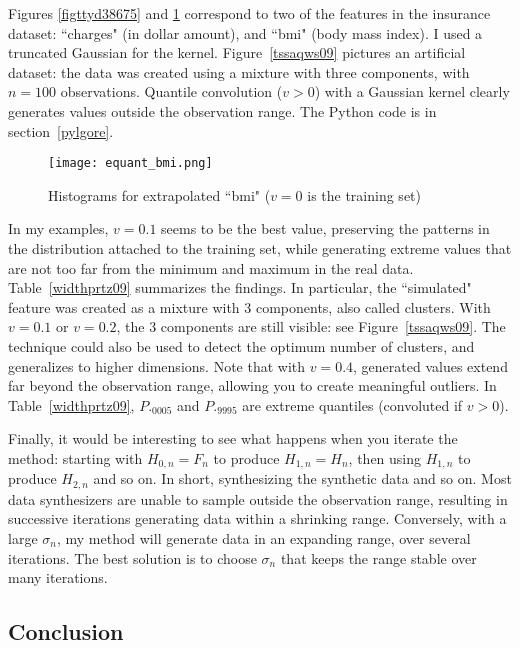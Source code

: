 \documentclass[oneside,10pt]{book}
\begin{document}
Figures \ref{figttyd38675} and  \ref{fig:pif65lkh} correspond to two of the features in the insurance dataset: ``charges" (in dollar amount), and ``bmi" (body mass index). I used a truncated Gaussian for the kernel.
Figure~\ref{tssaqws09} pictures an artificial dataset: the data was created using a mixture with three components, with $n=100$ observations. Quantile convolution ($v>0$) with a Gaussian kernel clearly generates values  outside the observation range. The Python code is in section~\ref{pylgore}.




\begin{figure}[H]
\centering
\texttt{[image: equant\_bmi.png]}
\caption{Histograms for extrapolated ``bmi" ($v=0$ is the training set)}
\label{fig:pif65lkh}
\end{figure}

In my examples, $v=0.1$ seems to be the best value, preserving the patterns in the distribution attached to the training set, while generating extreme values that are not too far from the minimum and maximum in
 the real data. Table~\ref{widthprtz09} summarizes the findings. In particular, the ``simulated" feature
 was created as a mixture with 3 components, also called clusters. With $v=0.1$ or $v=0.2$, the 3 components are still visible: see Figure~\ref{tssaqws09}.
The technique could also be used to detect the optimum number of clusters, and generalizes to higher dimensions. Note that with $v=0.4$, generated values extend far beyond the observation range, allowing
 you to create meaningful outliers. In Table~\ref{widthprtz09}, $P._{0005}$ and
 $P._{9995}$ are extreme quantiles (convoluted if $v>0$).

Finally, it would be interesting to see what happens when you iterate the method: starting
with $H_{0,n} =F_n$ to produce $H_{1,n}=H_n$, then using $H_{1,n}$ to produce
  $H_{2,n}$ and so on. In short, synthesizing the synthetic data and so on. Most data synthesizers are unable to sample outside the observation range, resulting
 in successive iterations generating data within a shrinking range. Conversely, with a large $\sigma_n$, my method will generate data in an expanding range, over several iterations.  The best solution is to choose $\sigma_n$ that keeps the range stable over many iterations.




\subsection{Conclusion}
\end{document}
